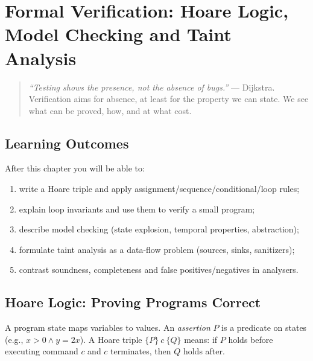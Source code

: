 \chapter{Formal Verification: Hoare Logic, Model Checking and Taint Analysis}
\label{ch:verification}

\begin{quote}
\emph{``Testing shows the presence, not the absence of bugs.''} --- Dijkstra. Verification aims for absence, at least for the property we can state. We see what can be proved, how, and at what cost.
\end{quote}

\noindent{}
\vspace{0.4em}

\section*{Learning Outcomes}
After this chapter you will be able to:
\begin{enumerate}[label=(L\arabic*)]
    \item write a Hoare triple and apply assignment/sequence/conditional/loop rules;
    \item explain loop invariants and use them to verify a small program;
    \item describe model checking (state explosion, temporal properties, abstraction);
    \item formulate taint analysis as a data-flow problem (sources, sinks, sanitizers);
    \item contrast soundness, completeness and false positives/negatives in analysers.
\end{enumerate}

\section{Hoare Logic: Proving Programs Correct}
\label{sec:hoare}
A program state maps variables to values. An \emph{assertion} $P$ is a predicate on states (e.g., $x>0\land y=2x$). A Hoare triple $\{P\}~c~\{Q\}$ means: if $P$ holds before executing command $c$ and $c$ terminates, then $Q$ holds after.

